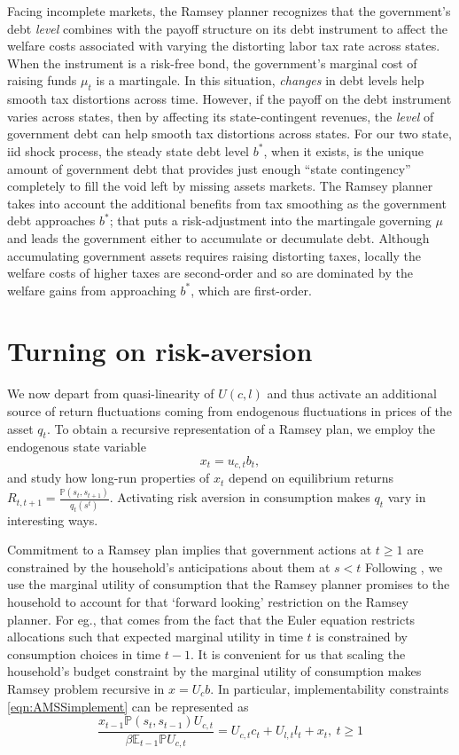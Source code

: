 \documentclass[12pt]{article}
\newcommand{\EE}{\mathbb E}
\begin{document}
	  Facing incomplete markets, the  Ramsey planner recognizes that   the government's debt {\em level} combines with  the
 payoff structure on its debt instrument to affect  the welfare costs associated with varying the distorting labor tax rate across states.  When the
  instrument is a risk-free bond, the government's marginal cost of raising funds $\mu_t$ is  a martingale. In this situation,
    {\em changes} in debt levels  help smooth tax distortions across time. 		
	However, if the  payoff on the debt instrument varies across states, then  by affecting its state-contingent revenues, the {\em level} of government debt can help smooth tax distortions across states.
	For our two state, iid shock process,  the steady state debt level $b^*$, when it exists, is the unique amount of government debt
that provides just enough ``state contingency'' completely to fill the void left by  missing assets markets.  The Ramsey planner takes into account the additional benefits from tax smoothing as the government debt approaches $b^*$;  that puts a risk-adjustment into the martingale governing $\mu$ and leads the
 government either to accumulate or decumulate debt.	
	 Although accumulating government assets requires  raising distorting  taxes, locally  the welfare costs of higher taxes are second-order and
so are  dominated by the welfare gains from approaching  $b^*$, which are first-order.



\section{Turning on risk-aversion}

  We now depart from quasi-linearity of $U(c,l)$ and thus activate an additional source of return fluctuations coming from endogenous fluctuations in prices of the asset $q_t$.  To obtain a recursive representation of a Ramsey plan,
  we employ the endogenous state variable
  \[x_t=u_{c,t}b_{t} ,\]
  and study how long-run properties of $x_t$ depend on equilibrium returns $R_{t,t+1}=\frac{\mathbb{P}(s_t,s_{t+1})}{q_t(s^t)}$.
   Activating risk aversion in consumption makes $q_t$ vary in interesting ways.

  Commitment to a Ramsey plan implies that government actions at $t \geq 1$ are constrained by the household's anticipations about them at $s < t$
	 Following \citet{Kydland1980}, we  use the  marginal utility of consumption that the
Ramsey planner promises to the household to account for that `forward looking' restriction on the Ramsey planner. For eg., that comes from the fact that the Euler equation restricts allocations such that expected marginal utility in time $t$ is constrained by consumption choices in time $t-1$.  It is convenient for us that scaling the household's  budget constraint by the  marginal utility
 of consumption makes Ramsey problem  recursive in  $x=U_c b$.  In particular, implementability constraints \eqref{eqn:AMSSimplement}
 can be represented as
		\begin{equation}
		\frac{x_{t-1} \mathbb{P}(s_t,s_{t-1}) U_{c,t}}{\beta \EE_{t-1} \mathbb{P}U_{c,t}}  = U_{c,t}c_t+U_{l,t} l_t + x_t, \ t \geq 1
	\end{equation}
\end{document}
